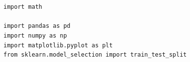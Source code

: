\documentclass[lang=cn,a4paper,cite=authoryear]{elegantpaper}
\begin{document}
\section*{}

\section*{}
\subsection*{} 
\begin{verbatim}
import math

import pandas as pd
import numpy as np
import matplotlib.pyplot as plt
from sklearn.model_selection import train_test_split



\end{verbatim}
\end{document}
